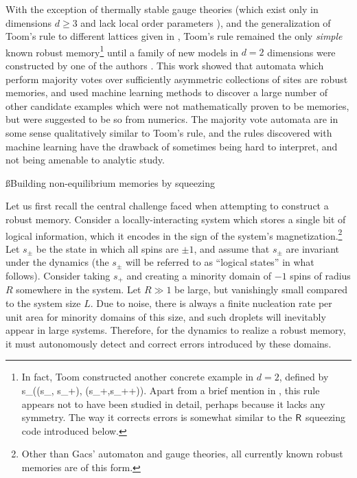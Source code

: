 \documentclass[pra,aps,twocolumn,groupedaddress,superscriptaddress,nofootinbib,preprintnumbers]{revtex4-2}
\begin{document}
	With the exception of thermally stable gauge theories (which exist only in dimensions $d\geq 3$ and lack local order parameters \cite{poulin2019self}), and the generalization of Toom's rule to different lattices given in \cite{kubica2019cellular}, Toom's rule remained the only {\it simple} known robust memory\footnote{In fact, Toom constructed another concrete example in $d=2$, defined by \cite{toom1980stable,fernandez2001non}
		\be s_\bfr \mt \max(\min(s_\bfr, s_{\bfr+\uvx}), \min(s_{\bfr+\uvy},s_{\bfr+\uvx+\uvy})).\ee 
		Apart from a brief mention in  \cite{ponselet2013phase}, this rule appears not to have been studied in detail, perhaps because it lacks any symmetry. The way it corrects errors is somewhat similar to the $\mathsf{R}$ squeezing code introduced below.} until a family of new models in $d=2$ dimensions were constructed by one of the authors \cite{pajouheshgar2025exploring}. This work showed that automata which perform majority votes over sufficiently asymmetric collections of sites are robust memories, and used machine learning methods to discover a large number of other candidate examples which were not mathematically proven to be memories, but were suggested to be so from numerics. The majority vote automata are in some sense qualitatively similar to Toom's rule, and the rules discovered with machine learning have the drawback of sometimes being hard to interpret, and not being amenable to analytic study.
	
	\ss{Building non-equilibrium memories by squeezing} 
	
	Let us first recall the central challenge faced when attempting to construct a robust memory. Consider a locally-interacting system which stores a single bit of logical information, which it encodes in the sign of the system's magnetization.\footnote{Other than Gacs' automaton and gauge theories, all currently known robust memories are of this form.} Let $s_\pm$ be the state in which all spins are $\pm1$, and assume that $s_\pm$ are invariant under the dynamics (the $s_\pm$ will be referred to as ``logical states'' in what follows). Consider taking $s_+$ and creating a minority domain of $-1$ spins of radius $R$ somewhere in the system. Let $R\gg 1$ be large, but vanishingly small compared to the system size $L$.  
	Due to noise, there is always a finite nucleation rate per unit area for minority domains of this size, and such droplets will inevitably appear in large systems. Therefore, for the dynamics to realize a robust memory, it must autonomously detect and correct errors introduced by these domains.
	
\end{document}
